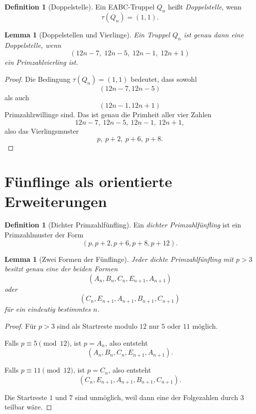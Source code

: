 \documentclass[11pt,a4paper]{article}
\newtheorem{lemma}[satz]{Lemma}
\theoremstyle{definition}
\newtheorem{definition}[satz]{Definition}
\theoremstyle{remark}
\begin{document}
	\begin{definition}[Doppelstelle]
		Ein EABC-Truppel \(Q_n\) heißt \emph{Doppelstelle}, wenn
		\[
		\tau(Q_n)=(1,1).
		\]
	\end{definition}
	
	\begin{lemma}[Doppelstellen und Vierlinge]
		Ein Truppel \(Q_n\) ist genau dann eine Doppelstelle, wenn
		\[
		(12n-7,\;12n-5,\;12n-1,\;12n+1)
		\]
		ein Primzahlvierling ist.
	\end{lemma}
	
	\begin{proof}
		Die Bedingung \(\tau(Q_n)=(1,1)\) bedeutet, dass sowohl
		\[
		(12n-7,12n-5)
		\]
		als auch
		\[
		(12n-1,12n+1)
		\]
		Primzahlzwillinge sind. Das ist genau die Primheit aller vier Zahlen
		\[
		12n-7,\ 12n-5,\ 12n-1,\ 12n+1,
		\]
		also das Vierlingsmuster
		\[
		p,\ p+2,\ p+6,\ p+8.
		\]
	\end{proof}
	
	\section{Fünflinge als orientierte Erweiterungen}
	
	\begin{definition}[Dichter Primzahlfünfling]
		Ein \emph{dichter Primzahlfünfling} ist ein Primzahlmuster der Form
		\[
		(p,p+2,p+6,p+8,p+12).
		\]
	\end{definition}
	
	\begin{lemma}[Zwei Formen der Fünflinge]
		Jeder dichte Primzahlfünfling mit \(p>3\) besitzt genau eine der beiden Formen
		\[
		(A_n,B_n,C_n,E_{n+1},A_{n+1})
		\]
		oder
		\[
		(C_n,E_{n+1},A_{n+1},B_{n+1},C_{n+1})
		\]
		für ein eindeutig bestimmtes \(n\).
	\end{lemma}
	
	\begin{proof}
		Für \(p>3\) sind als Startreste modulo \(12\) nur \(5\) oder \(11\) möglich.
		
		Falls \(p\equiv 5\pmod{12}\), ist \(p=A_n\), also entsteht
		\[
		(A_n,B_n,C_n,E_{n+1},A_{n+1}).
		\]
		
		Falls \(p\equiv 11\pmod{12}\), ist \(p=C_n\), also entsteht
		\[
		(C_n,E_{n+1},A_{n+1},B_{n+1},C_{n+1}).
		\]
		
		Die Startreste \(1\) und \(7\) sind unmöglich, weil dann eine der Folgezahlen durch \(3\)
		teilbar wäre.
	\end{proof}
	
\end{document}
